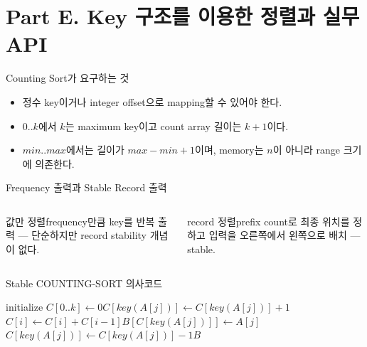 \section{Part E. Key 구조를 이용한 정렬과 실무 API}
\begin{frame}{Counting Sort가 요구하는 것}
\begin{itemize}\item 정수 key이거나 integer offset으로 mapping할 수 있어야 한다.\item $0..k$에서 $k$는 maximum key이고 count array 길이는 $k+1$이다.\item $min..max$에서는 길이가 $max-min+1$이며, memory는 $n$이 아니라 range 크기에 의존한다.\end{itemize}
\end{frame}
\begin{frame}{Frequency 출력과 Stable Record 출력}
\begin{columns}[T]\begin{block}{값만 정렬}frequency만큼 key를 반복 출력 — 단순하지만 record stability 개념이 없다.\end{block}\begin{block}{record 정렬}prefix count로 최종 위치를 정하고 입력을 오른쪽에서 왼쪽으로 배치 — stable.\end{block}\end{columns}
\end{frame}
\begin{frame}{Stable COUNTING-SORT 의사코드}
\small\begin{algorithmic}[1]\State initialize $C[0..k]\gets0$\State $C[key(A[j])]\gets C[key(A[j])]+1$\EndFor{}\State $C[i]\gets C[i]+C[i-1]$\EndFor{}\State $B[C[key(A[j])]]\gets A[j]$\State $C[key(A[j])]\gets C[key(A[j])]-1$\EndFor\State \Return $B$\EndProcedure\end{algorithmic}
\vfill{}
\end{frame}
